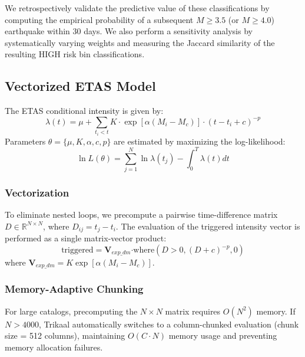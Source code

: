 \documentclass[journal]{IEEEtran}
\begin{document}
We retrospectively validate the predictive value of these classifications by computing the empirical probability of a subsequent $M \ge 3.5$ (or $M \ge 4.0$) earthquake within 30 days. We also perform a sensitivity analysis by systematically varying weights and measuring the Jaccard similarity of the resulting HIGH risk bin classifications.

\subsection{Vectorized ETAS Model}
The ETAS conditional intensity is given by:
\begin{equation}
\lambda(t) = \mu + \sum_{t_i < t} K \cdot \exp[\alpha(M_i - M_c)] \cdot (t - t_i + c)^{-p}
\end{equation}
Parameters $\theta = \{\mu, K, \alpha, c, p\}$ are estimated by maximizing the log-likelihood:
\begin{equation}
\ln L(\theta) = \sum_{j=1}^N \ln \lambda(t_j) - \int_0^T \lambda(t) dt
\end{equation}

\subsubsection{Vectorization}
To eliminate nested loops, we precompute a pairwise time-difference matrix $D \in \mathbb{R}^{N \times N}$, where $D_{ij} = t_j - t_i$. The evaluation of the triggered intensity vector is performed as a single matrix-vector product:
\begin{equation}
\text{triggered} = \mathbf{V}_{exp\_dm} \mathbf{\cdot} \text{where}(D > 0, (D + c)^{-p}, 0)
\end{equation}
where $\mathbf{V}_{exp\_dm} = K \exp[\alpha(M_i - M_c)]$.

\subsubsection{Memory-Adaptive Chunking}
For large catalogs, precomputing the $N \times N$ matrix requires $O(N^2)$ memory. If $N > 4000$, Trikaal automatically switches to a column-chunked evaluation (chunk size = 512 columns), maintaining $O(C \cdot N)$ memory usage and preventing memory allocation failures.
\end{document}
